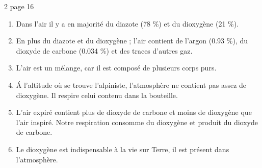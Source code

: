 \begin{myact}{2 page 16}
	\begin{enumerate}\pause
		\item Dans l'air il y a en majorité du diazote (78 \%) et du dioxygène (21 \%).\pause
		\item En plus du diazote et du dioxygène ; l'air contient de l'argon (\num{0.93} \%), du dioxyde de carbone (\num{0.034} \%) et des traces d'autres gaz.\pause
		\item L'air est un mélange, car il est composé de plusieurs corps purs.\pause
		\item \'A l'altitude où se trouve l'alpiniste, l'atmosphère ne contient pas assez de dioxygène. Il respire celui contenu dans la bouteille.\pause
		\item L'air expiré contient plus de dioxyde de carbone  et moins de dioxygène que l'air inspiré. Notre respiration consomme du dioxygène et produit du dioxyde de carbone.\pause
		\item Le dioxygène est indispensable à la vie sur Terre, il est présent dans l'atmosphère. 
	\end{enumerate}
\end{myact}
